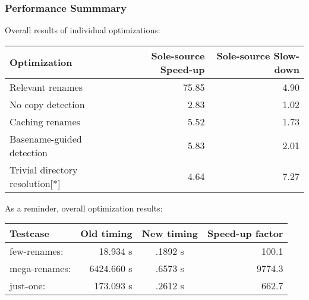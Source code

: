 \documentclass[compress,t]{beamer}
\begin{document}
\begin{frame}
  \frametitle{Performance Summmary}

  Overall results of individual optimizations:\\
  \pause
  \vspace*{0.5\baselineskip}
  \qquad
  \begin{tabular}{l|r|r}
    Optimization                    &
      \multicolumn{1}{p{5.5em}}{\centering Sole-source Speed-up}  &
      \multicolumn{1}{|p{5.5em}}{\centering Sole-source Slow-down} \\
    \hline
    Relevant renames                & 75.85\hspace*{1.4em} & 4.90 \hspace*{1.4em} \\
    No copy detection               &  2.83\hspace*{1.4em} & 1.02 \hspace*{1.4em} \\
    Caching renames                 &  5.52\hspace*{1.4em} & 1.73 \hspace*{1.4em} \\
    Basename-guided detection       &  5.83\hspace*{1.4em} & 2.01 \hspace*{1.4em} \\
    Trivial directory resolution[*] &  4.64\hspace*{1.4em} & 7.27 \hspace*{1.4em}
  \end{tabular}

  \pause
  \vspace*{1.5\baselineskip}
  As a reminder, overall optimization results:\\
  \vspace*{0.5\baselineskip}
  \qquad
  \begin{tabular}{l|r|c|r}
    Testcase      & \multicolumn{1}{c|}{Old timing}
                  & \multicolumn{1}{c|}{New timing}
                  & \multicolumn{1}{p{4.4em}}{\centering Speed-up factor} \\
    \hline
    few-renames:  &   18.934 s & .1892 s &  100.1 \hspace*{0.3em} \\
    mega-renames: & 6424.660 s & .6573 s & 9774.3 \hspace*{0.3em} \\
    just-one:     &  173.093 s & .2612 s &  662.7 \hspace*{0.3em}
  \end{tabular}

\end{frame}
\end{document}
